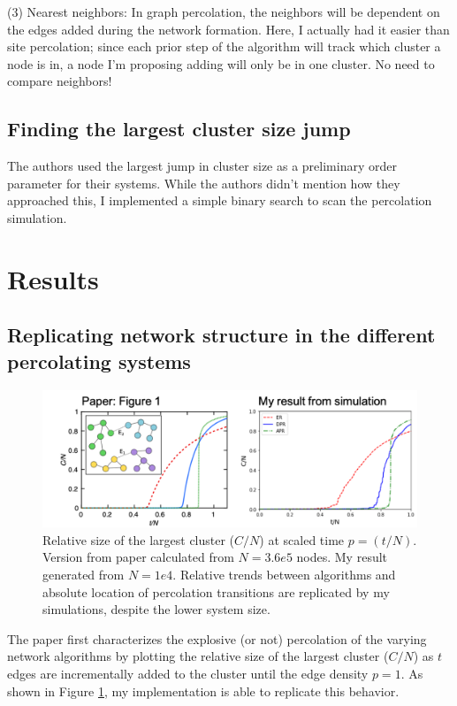 \documentclass[11pt]{article}   	%
\begin{document}
(3) Nearest neighbors: In graph percolation, the neighbors will be dependent on the edges added during the network formation. Here, I actually had it easier than site percolation; since each prior step of the algorithm will track which cluster a node is in, a node I'm proposing adding will only be in one cluster. No need to compare neighbors!
 

\subsection{Finding the largest cluster size jump}
The authors used the largest jump in cluster size as a preliminary order parameter for their systems. While the authors didn't mention how they approached this, I implemented a simple binary search to scan the percolation simulation.  




\section{Results}

\subsection{Replicating network structure in the different percolating systems}

\begin{figure}[t]
\begin{center}
\includegraphics[width=\textwidth]{fig/fig1_comparison.png}
\caption{Relative size of the largest cluster ($C/N$) at scaled time $p=(t/N)$. Version from paper calculated from $N=3.6e5$ nodes. My result generated from $N=1e4$. Relative trends between algorithms and absolute location of percolation transitions are replicated by my simulations, despite the lower system size.}
\label{fig:fig1}
\end{center}
\end{figure}

The paper first characterizes the explosive (or not) percolation of the varying network algorithms by plotting the relative size of the largest cluster ($C/N$) as $t$ edges are incrementally added to the cluster until the edge density $p=1$. As shown in Figure \ref{fig:fig1}, my implementation is able to replicate this behavior.
\end{document}
